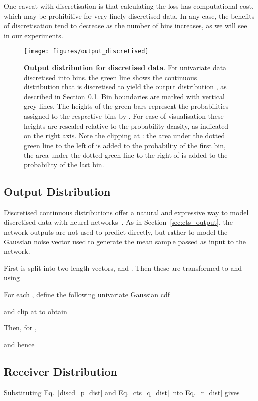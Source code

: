 \documentclass[11pt,table]{article}
\newcommand{\0}[1]{\constvec{0}{#1}}
\newcommand{\1}[1]{\constvec{1}{#1}}
\begin{document}
One caveat with discretisation is that calculating the loss has  computational cost, which may be prohibitive for very finely discretised data. 
In any case, the benefits of discretisation tend to decrease as the number of bins increases, as we will see in our experiments.
\begin{figure}[t!] 
\texttt{[image: figures/output\_discretised]}
\caption{\textbf{Output distribution for discretised data}. For univariate data  discretised into  bins, the green line shows the continuous distribution  that is discretised to yield the output distribution , as described in Section~\ref{sec:discd_output}. Bin boundaries are marked with vertical grey lines. The heights of the green bars represent the probabilities assigned to the respective bins by . For ease of visualisation these heights are rescaled relative to the probability density, as indicated on the right axis. Note the clipping at : the area under the dotted green line to the left of  is added to the probability of the first bin, the area under the dotted green line to the right of  is added to the probability of the last bin.}
\label{fig:discd_p}
\end{figure}
\subsection{Output Distribution \texorpdfstring{}{}}\label{sec:discd_output}
Discretised continuous distributions offer a natural and expressive way to model discretised data with neural networks~\cite{salimans2017pixel}. 
As in Section~\ref{sec:cts_output}, the network outputs  are not used to predict  directly, but rather to model the Gaussian noise vector  used to generate the mean sample  passed as input to the network.

First  is split into two length  vectors,  and .
Then these are transformed to  and  using

For each , define the following univariate Gaussian cdf

and clip at  to obtain

Then, for ,

and hence

\subsection{Receiver Distribution \texorpdfstring{}{}}
Substituting Eq.~\ref{discd_p_dist} and Eq. \ref{cts_q_dist} into Eq.~\ref{r_dist} gives
\end{document}
